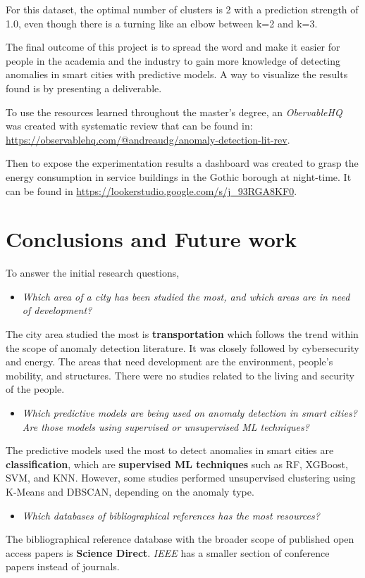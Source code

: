 \documentclass[a4paper,12pt,twoside]{ThesisStyle}
\begin{document}
For this dataset, the optimal number of clusters is 2 with a prediction strength of 1.0, even though there is a turning like an elbow between k=2 and k=3. 

The final outcome of this project is to spread the word and make it easier for people in the academia and the industry to gain more knowledge of detecting anomalies in smart cities with predictive models. A way to visualize the results found is by presenting a deliverable.

To use the resources learned throughout the master's degree, an \textit{ObervableHQ} was created with systematic review that can be found in: \url{https://observablehq.com/@andreaudg/anomaly-detection-lit-rev}.

Then to expose the experimentation results a dashboard was created to grasp the energy consumption in service buildings in the Gothic borough at night-time. It can be found in \url{https://lookerstudio.google.com/s/j_93RGA8KF0}.


\chapter{Conclusions and Future work}
\label{cap:concl}

To answer the initial research questions, 
\begin{itemize}
  \item \textit{Which area of a city has been studied the most, and which areas are in need of development?}
\end{itemize}
The city area studied the most is \textbf{transportation} which follows the trend within the scope of anomaly detection literature. It was closely followed by cybersecurity and energy. The areas that need development are the environment, people's mobility, and structures. There were no studies related to the living and security of the people.
\begin{itemize}
  \item \textit{Which predictive models are being used on anomaly detection in smart cities? Are those models using supervised or unsupervised ML techniques?}
\end{itemize}
The predictive models used the most to detect anomalies in smart cities are \textbf{classification}, which are \textbf{supervised ML techniques} such as RF, XGBoost, SVM, and KNN. However, some studies performed unsupervised clustering using K-Means and DBSCAN, depending on the anomaly type.
\begin{itemize}
  \item \textit{Which databases of bibliographical references has the most resources?}
\end{itemize}
The bibliographical reference database with the broader scope of published open access papers is \textbf{Science Direct}. \textit{IEEE} has a smaller section of conference papers instead of journals.
\end{document}
